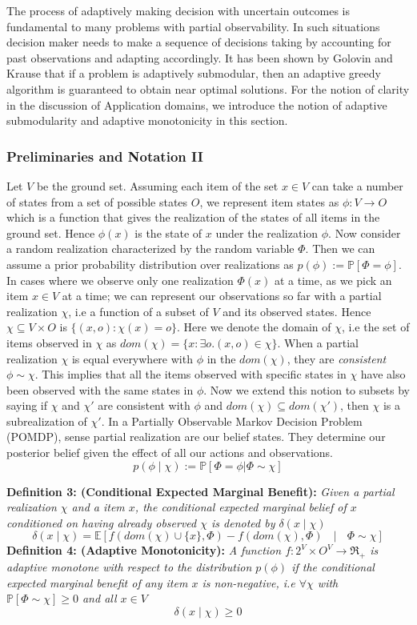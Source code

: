 The process of adaptively making decision with uncertain outcomes is fundamental to many problems with partial observability. In such situations decision maker needs to make a sequence of decisions taking by accounting for past observations and adapting accordingly. It has been shown by Golovin and Krause \cite{Golovin} that if a problem is adaptively submodular, then an adaptive greedy algorithm is guaranteed to obtain near optimal solutions.
For the notion of clarity in the discussion of Application domains, we introduce the notion of adaptive submodularity and adaptive monotonicity in this section.

\subsubsection{Preliminaries and Notation II}
Let $V$ be the ground set. Assuming each item of the set $x\in V$ can take a number of states from a set of possible states $O$, we represent item states as $\phi:V \rightarrow O$ which is a function that gives the realization of the states of all items in the ground set. Hence $\phi(x)$ is the state of $x$ under the realization $\phi$. Now consider a random realization characterized by the random variable $\Phi$. Then we can assume a prior probability distribution over realizations as $p(\phi) := \mathbb{P}[\Phi = \phi]$. 
In cases where we observe only one realization $\Phi(x)$ at a time, as we pick an item $x \in V$ at a time; we can represent our observations so far with a partial realization $\chi$, i.e a function of a subset of $V$ and its observed states. Hence $\chi \subseteq V \times O$ is $\{(x,o):\chi(x) = o\}$. Here we denote the domain of $\chi$, i.e the set of items observed in $\chi$ as $dom(\chi) = \{ x: \exists o.(x,o) \in \chi \}$. When a partial realization $\chi$ is equal everywhere with $\phi$ in the $dom(\chi)$, they are {\it consistent} $\phi \sim \chi$.
This implies that all the items observed with specific states in $\chi$ have also been observed with the same states in $\phi$. Now we extend this notion to subsets by saying if $\chi$ and $\chi'$ are consistent with $\phi$ and $dom(\chi)\subseteq dom(\chi')$, then $\chi$ is a subrealization of $\chi'$. In a Partially Observable Markov Decision Problem (POMDP), sense partial realization are our belief states. They determine our posterior belief given the effect of all our actions and observations.
\[
 p(\phi\mid\chi) := \mathbb{P}[\Phi=\phi | \Phi \sim \chi]
\]

{\bf Definition 3: (Conditional Expected Marginal Benefit):} 
{\it Given a partial realization $\chi$ and a item $x$, the conditional expected marginal belief of $x$ conditioned on having already observed $\chi$ is denoted by $\delta(x\mid\chi)$
\[
 \delta(x\mid\chi) = \mathbb{E}[f(dom(\chi)\cup\{x\},\Phi) - f(dom(\chi),\Phi) \text{ } \mid \text{ } \Phi \sim \chi]
\]
}
{\bf Definition 4: (Adaptive Monotonicity):}
{\it A function $f:2^V \times O^V \rightarrow \Re_+$ is adaptive monotone with respect to the distribution $p(\phi)$ if the conditional expected marginal benefit of any item $x$ is non-negative, i.e $\forall \chi$ with $\mathbb{P}[\Phi \sim \chi] \geq 0$ and all $x\in V$ }
\[
 \delta(x\mid\chi) \geq 0
\]

